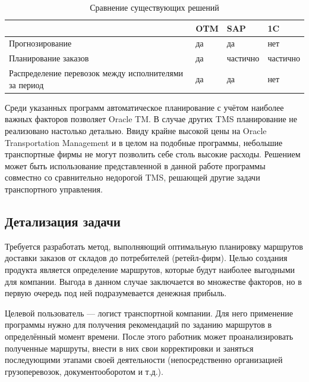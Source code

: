 	\begin{table}[h]
		\begin{center}
			\caption{Сравнение существующих решений}
			\label{cmp_table}
			\begin{tabular}{| p{5cm} | p{2.5cm} | p{2.5cm} | p{2.5cm} |}
				\hline
				\backslashbox{\textbf{Функция}}{\textbf{TMS}} &
				OTM &
				SAP &
				1C \\
				
				\hline
				Прогнозирование & 
				да &
				да &
				нет \\
				 
				\hline
				Планирование заказов &
				да &
				частично &
				частично \\
				
				\hline
				Распределение перевозок между исполнителями за период &
				да &
				да &
				нет \\
				
				\hline
			\end{tabular}
		\end{center}
	\end{table}
	
	Среди указанных программ автоматическое планирование с учётом наиболее важных факторов позволяет Oracle TM. В случае других TMS планирование не реализовано настолько детально. Ввиду крайне высокой цены\cite{subj:tms_cmp} на Oracle Transportation Management и в целом на подобные программы, небольшие транспортные фирмы не могут позволить себе столь высокие расходы. Решением может быть использование представленной в данной работе программы совместно со сравнительно недорогой TMS, решающей другие задачи транспортного управления.

\subsection{Детализация задачи}
	Требуется разработать метод, выполняющий оптимальную планировку маршрутов доставки заказов от складов до потребителей (ретейл-фирм). Целью создания продукта является определение маршрутов, которые будут наиболее выгодными для компании. Выгода в данном случае заключается во множестве факторов, но в первую очередь под ней подразумевается денежная прибыль.
	
	Целевой пользователь --- логист транспортной компании. Для него применение программы нужно для получения рекомендаций по заданию маршрутов в определённый момент времени. После этого работник может проанализировать полученные маршруты, внести в них свои корректировки и заняться последующими этапами своей деятельности (непосредственно организацией грузоперевозок, документооборотом и т.д.).
	
